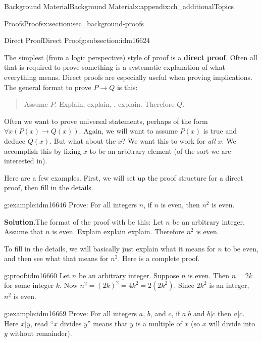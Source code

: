 \documentclass[oneside,10pt,]{book}
\newcommand{\terminology}[1]{\textbf{#1}}
\numberwithin{equation}{chapter}
\def\imp{\rightarrow}
\begin{document}
\begin{appendixptx}{Background Material}{}{Background Material}{}{}{x:appendix:ch_additionalTopics}
\begin{sectionptx}{Proofs}{}{Proofs}{}{}{x:section:sec_background-proofs}
\begin{introduction}{}
\end{introduction}%
%
%
\typeout{************************************************}
\typeout{************************************************}
%
\begin{subsectionptx}{Direct Proof}{}{Direct Proof}{}{}{g:subsection:idm16624}
%
\par
The simplest (from a logic perspective) style of proof is a \terminology{direct proof}. Often all that is required to prove something is a systematic explanation of what everything means. Direct proofs are especially useful when proving implications. The general format to prove \(P \imp Q\) is this:%
\begin{quote}%
Assume \(P\). Explain, explain, \textellipsis{}, explain. Therefore \(Q\).%
\end{quote}
Often we want to prove universal statements, perhaps of the form \(\forall x (P(x) \imp Q(x))\). Again, we will want to assume \(P(x)\) is true and deduce \(Q(x)\). But what about the \(x\)? We want this to work for \emph{all} \(x\). We accomplish this by fixing \(x\) to be an arbitrary element (of the sort we are interested in).%
\par
Here are a few examples. First, we will set up the proof structure for a direct proof, then fill in the details.%
\begin{example}{}{g:example:idm16646}%
Prove: For all integers \(n\), if \(n\) is even, then \(n^2\) is even.%
\par\smallskip%
\noindent\textbf{Solution}.\hypertarget{g:solution:idm16652}{}\quad{}The format of the proof with be this: Let \(n\) be an arbitrary integer. Assume that \(n\) is even. Explain explain explain. Therefore \(n^2\) is even.%
\par
To fill in the details, we will basically just explain what it means for \(n\) to be even, and then see what that means for \(n^2\). Here is a complete proof.%
\begin{proofptx}{}{g:proof:idm16660}
Let \(n\) be an arbitrary integer. Suppose \(n\) is even. Then \(n = 2k\) for some integer \(k\). Now \(n^2 = (2k)^2 = 4k^2 = 2(2k^2)\). Since \(2k^2\) is an integer, \(n^2\) is even.%
\end{proofptx}
\end{example}
\begin{example}{}{g:example:idm16669}%
Prove: For all integers \(a\), \(b\), and \(c\), if \(a|b\) and \(b|c\) then \(a|c\). Here \(x|y\), read ``\(x\) divides \(y\)'' means that \(y\) is a multiple of \(x\) (so \(x\) will divide into \(y\) without remainder).%

\end{example}
\end{subsectionptx}
\end{sectionptx}
\end{appendixptx}
\end{document}
